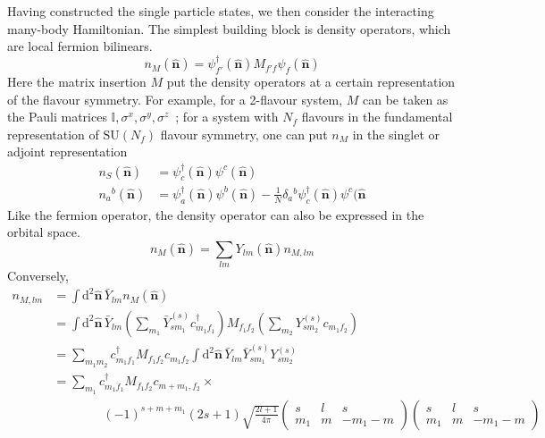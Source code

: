 \documentclass{timesjhep}
\begin{document}
Having constructed the single particle states, we then consider the interacting many-body Hamiltonian. The simplest building block is density operators, which are local fermion bilinears. 
\begin{equation}
    n_M(\hat{\mathbf{n}})=\psi_{f'}^\dagger(\hat{\mathbf{n}})M_{f'f}\psi_f(\hat{\mathbf{n}})
\end{equation}
Here the matrix insertion $M$ put the density operators at a certain representation of the flavour symmetry. For example, for a 2-flavour system, $M$ can be taken as the Pauli matrices $\mathbb{I},\sigma^x,\sigma^y,\sigma^z$~; for a system with $N_f$ flavours in the fundamental representation of $\mathrm{SU}(N_f)$ flavour symmetry, one can put $n_M$ in the singlet or adjoint representation 
\begin{align}
    n_S(\hat{\mathbf{n}})&=\psi_{c}^\dagger(\hat{\mathbf{n}})\psi^c(\hat{\mathbf{n}})\nonumber\\ 
    n_a{}^b(\hat{\mathbf{n}})&=\psi_{a}^\dagger(\hat{\mathbf{n}})\psi^b(\hat{\mathbf{n}})-\tfrac{1}{N}\delta_{a}{}^b\psi_c^\dagger(\hat{\mathbf{n}})\psi^c(\hat{\mathbf{n}}
\end{align} 
Like the fermion operator, the density operator can also be expressed in the orbital space. 
\begin{equation}
    n_M(\hat{\mathbf{n}})=\sum_{lm}Y_{lm}(\hat{\mathbf{n}})n_{M,lm}
\end{equation}
Conversely, 
\begin{align}
    n_{M,lm}&=\int\mathrm{d}^2\hat{\mathbf{n}}\,\bar{Y}_{lm}n_M(\hat{\mathbf{n}})\nonumber\\
    &=\int\mathrm{d}^2\hat{\mathbf{n}}\,\bar{Y}_{lm}\left(\sum_{m_1}\bar{Y}^{(s)}_{sm_1}c^\dagger_{m_1f_1}\right)M_{f_1f_2}\left(\sum_{m_2}Y^{(s)}_{sm_2}c_{m_1f_2}\right)\nonumber\\
    &=\sum_{m_1m_2}c^\dagger_{m_1f_1}M_{f_1f_2}c_{m_1f_2}\int\mathrm{d}^2\hat{\mathbf{n}}\,\bar{Y}_{lm}\bar{Y}^{(s)}_{sm_1}Y^{(s)}_{sm_2}\nonumber\\
    &=\sum_{m_1}c^\dagger_{m_1f_1}M_{f_1f_2}c_{m+m_1,f_2}\times\nonumber\\
    &\qquad\qquad(-1)^{s+m+m_1}(2s+1)\sqrt{\frac{2l+1}{4\pi}}\begin{pmatrix}s&l&s\\m_1&m&-m_1-m\end{pmatrix}\begin{pmatrix}s&l&s\\m_1&m&-m_1-m\end{pmatrix}
\end{align}
\end{document}
